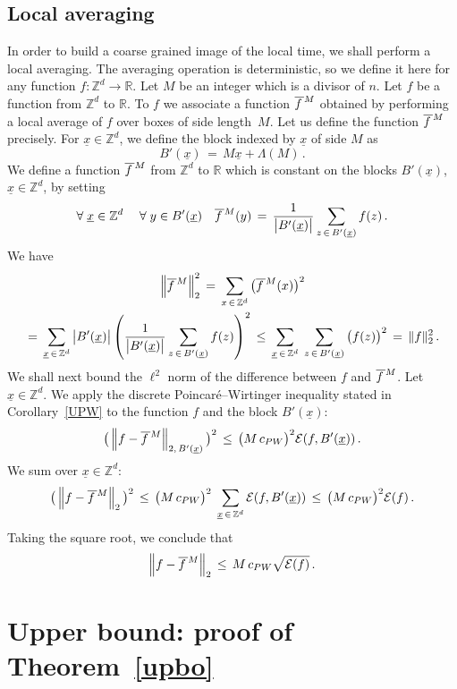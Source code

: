 \documentclass[10pt]{amsart}
\theoremstyle{definition}\newtheorem{defi}[theo]{Definition}\newtheorem{rema}[theo]{Remark}\newtheorem{exam}[theo]{Example}\newtheorem{exem}[theo]{Example}\newtheorem{nota}[theo]{Notation}
\newcommand{\xx}{{\underline{x}}}
\newcommand*\fm{\overline{f\,}^{\lower2pt\hbox{$\scriptstyle M$}}}
\newcommand*\Z {{\mathbb Z}}
\newcommand*\Zd {{\mathbb Z^d}}
\newcommand*\R{\mathbb{R}}
\newcommand*\La {{\Lambda}}
\newcommand{\cE}{\mathcal{E}}
\let\oldforall\forall
\renewcommand*{\forall}{\mathrel{\oldforall}}
\begin{document}
\subsection{Local averaging}\label{loca}
In order to build a coarse grained image of the local time, we shall perform a local averaging. The averaging operation is deterministic, so we define it here for any function $f:\Zd\to\R$. Let $M$ be an integer which is a divisor of $n$. Let $f$ be a function from $\Zd$ to $\R$. To $f$ we associate a function $\fm$ obtained by performing a local average of $f$ over boxes of side length~$M$. Let us define the function $\fm$ precisely. For $\xx\in \Zd$, we define the block indexed by $\xx$ of side $M$ as
\[
B'(\xx)\, =\, M\xx+\La(M)\,.
\]
We define a function $\fm$ from $\Z^d$ to $\R$ which is constant on the blocks $B'(\xx)$, $\xx\in\Zd$, by setting
\[
\forall \xx\in\Zd\quad\forall y\in
B'(\xx)\quad
\fm(y)\,=\,\frac{1}{\big|B'(\xx)\big|}\sum_{z\,\in\,B'(\xx)}f(z)\,.
\]
We have
\begin{multline}\label{normctl}
\left\|\fm\right\|_2^2\,=\,\sum_{x\,\in\,\Zd}\big(\fm(x)\big)^2\\
\,=\,\sum_{\xx\,\in\,\Zd}
\big|B'(\xx)\big|\left(
\frac{1}{\big|B'(\xx)\big|}\sum_{z\,\in\, B'(\xx)}f(z)\right)^2
\,\leq\,
\sum_{\xx\,\in\,\Zd}\;
\sum_{z\,\in\,B'(\xx)}\big(f(z)\big)^2
\,=\,\|f\|_2^2
\,.
\end{multline}
We shall next bound the $\ell^2$ norm of the difference between $f$ and $\fm$. Let $\xx\in \Zd$. We apply the discrete Poincaré--Wirtinger inequality stated in Corollary~\ref{UPW} to the function $f$ and the block $B'(\xx)$:
\[
\big(\left\|f-\fm\right\|_{2,\,B'(\xx)}\big)^2
\,\leq\,\big(M\,c_{PW}\big)^2
{\cE(f,B'(\xx))}\,.
\]
We sum over $\xx\in\Zd$:
\[
\big(\left\|f-\fm\right\|_{2}\big)^2
\,\leq\,\big(M\,c_{PW}\big)^2\;
\sum_{\xx\,\in\,\Zd}{\cE(f,B'(\xx))}
\,\leq\,\big(M\,c_{PW}\big)^2
{\cE(f)}\,.
\]
Taking the square root, we conclude that
\begin{equation}\label{difa}
\left\|f-\fm\right\|_{2}
\,\leq\,M\,c_{PW}
\sqrt{\cE(f)}\,.
\end{equation}
\section{Upper bound: proof of Theorem~\ref{upbo}}\label{S:proof_upbo}
\label{star}
\end{document}
